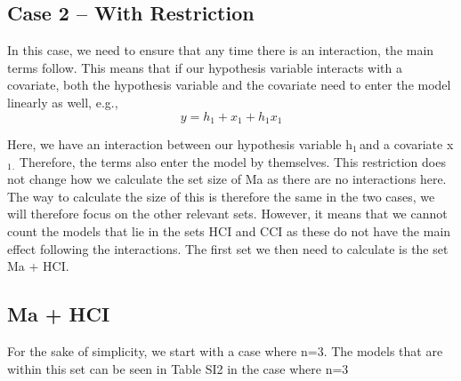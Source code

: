 \subsection{Case 2 – With Restriction}

In this case, we need to ensure that any time there is an interaction, the main terms follow. This means that if our hypothesis variable interacts with a covariate, both the hypothesis variable and the covariate need to enter the model linearly as well, e.g.,
\[y=h_1+x_1+h_1x_1\] 

Here, we have an interaction between our hypothesis variable h${}_{1\ }$and a covariate x${}_{1}$${}_{.}$ Therefore, the terms also enter the model by themselves. This restriction does not change how we calculate the set size of Ma as there are no interactions here. The way to calculate the size of this is therefore the same in the two cases, we will therefore focus on the other relevant sets. However, it means that we cannot count the models that lie in the sets HCI and CCI as these do not have the main effect following the interactions. The first set we then need to calculate is the set Ma + HCI.

\subsection{Ma + HCI}

For the sake of simplicity, we start with a case where n=3. The models that are within this set can be seen in Table SI2 in the case where n=3 \\

